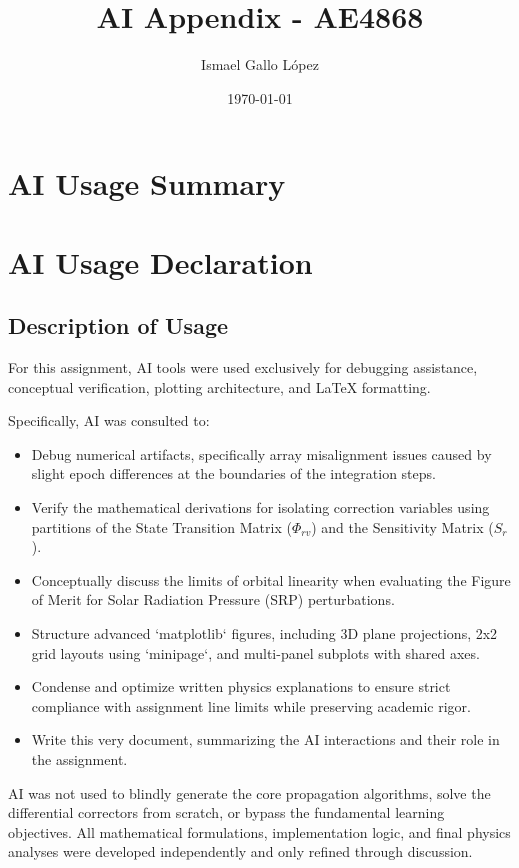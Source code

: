 \documentclass[a4paper,12pt]{article}
\title{AI Appendix - AE4868}
\author{Ismael Gallo López} %
\date{\today}
\begin{document}
\maketitle

\section*{AI Usage Summary}

\section*{AI Usage Declaration}

\subsection*{Description of Usage}

For this assignment, AI tools were used exclusively for debugging assistance, conceptual verification, plotting architecture, and LaTeX formatting. 

Specifically, AI was consulted to:

\begin{itemize}
  \item Debug numerical artifacts, specifically array misalignment issues caused by slight epoch differences at the boundaries of the integration steps.
  \item Verify the mathematical derivations for isolating correction variables using partitions of the State Transition Matrix ($\Phi_{rv}$) and the Sensitivity Matrix ($S_r$).
  \item Conceptually discuss the limits of orbital linearity when evaluating the Figure of Merit for Solar Radiation Pressure (SRP) perturbations.
  \item Structure advanced `matplotlib` figures, including 3D plane projections, 2x2 grid layouts using `minipage`, and multi-panel subplots with shared axes.
  \item Condense and optimize written physics explanations to ensure strict compliance with assignment line limits while preserving academic rigor.
  \item Write this very document, summarizing the AI interactions and their role in the assignment.
\end{itemize}

AI was not used to blindly generate the core propagation algorithms, solve the differential correctors from scratch, or bypass the fundamental learning objectives. All mathematical formulations, implementation logic, and final physics analyses were developed independently and only refined through discussion.
\end{document}
